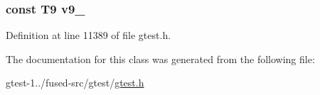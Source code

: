 \hypertarget{classtesting_1_1internal_1_1ValueArray23_a6356e16cf54a9dfac8525f20242af31e}{
\subsubsection[{v9\-\_\-}]{\setlength{\rightskip}{0pt plus 5cm}const \-T9 {\bf v9\-\_\-}}}\label{dd/d4d/classtesting_1_1internal_1_1ValueArray23_a6356e16cf54a9dfac8525f20242af31e}


\-Definition at line 11389 of file gtest.\-h.



\-The documentation for this class was generated from the following file\-:\begin{DoxyCompactItemize}
\item 
gtest-\/1../fused-\/src/gtest/\hyperlink{fused-src_2gtest_2gtest_8h}{gtest.\-h}\end{DoxyCompactItemize}

